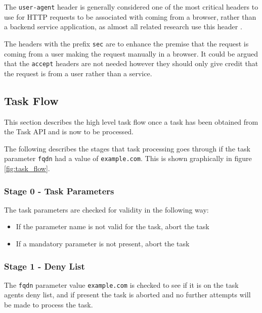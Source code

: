 \documentclass{mscreport}
\begin{document}
\vspace{0.3cm} \noindent
The \texttt{user-agent} header is generally considered one of the most critical headers to use for HTTP requests to be associated with coming from a browser, rather than a backend service application, as almost all related research use this header \cite{Patil2017-bg,Buchanan2018-xz,Amann2017-co,Kotzias2018-wd,Poteat2021-zr,Van_Goethem2014-ao,Chen2016-dl,Kumar2017-qw,Michael2015-hn}.

\vspace{0.3cm} \noindent
The headers with the prefix \texttt{sec} are to enhance the premise that the request is coming from a user making the request manually in a browser. It could be argued that the \texttt{accept} headers are not needed however they should only give credit that the request is from a user rather than a service.

\subsection{Task Flow}
\label{section:task_flow}

This section describes the high level task flow once a task has been obtained from the Task API and is now to be processed.

\vspace{0.3cm} \noindent
The following describes the stages that task processing goes through if the task parameter \texttt{fqdn} had a value of \texttt{example.com}. This is shown graphically in figure \ref{fig:task_flow}.

\subsubsection{Stage 0 - Task Parameters}

The task parameters are checked for validity in the following way:
\begin{itemize}
	\setlength\itemsep{0.1em}
    \item If the parameter name is not valid for the task, abort the task
    \item If a mandatory parameter is not present, abort the task
\end{itemize}

\subsubsection{Stage 1 - Deny List}

The \texttt{fqdn} parameter value \texttt{example.com} is checked to see if it is on the task agents deny list, and if present the task is aborted and no further attempts will be made to process the task.
\end{document}

